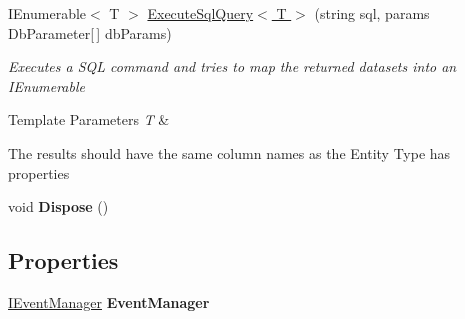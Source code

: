 \begin{DoxyCompactItemize}
I\-Enumerable$<$ T $>$ \hyperlink{class_framework_extension_1_1_entity_framework_1_1_tests_1_1_unit_tests_1_1_e_f_failure_context_ad70050780ddca2e8a5e749a3e0d26a32}{Execute\-Sql\-Query$<$ T $>$} (string sql, params Db\-Parameter\mbox{[}$\,$\mbox{]} db\-Params)
\begin{DoxyCompactList}\small\item\em Executes a S\-Q\-L command and tries to map the returned datasets into an I\-Enumerable
\begin{DoxyTemplParams}{Template Parameters}
{\em T} & \\
\hline
\end{DoxyTemplParams}
The results should have the same column names as the Entity Type has properties \end{DoxyCompactList}\item 
\hypertarget{class_framework_extension_1_1_entity_framework_1_1_tests_1_1_unit_tests_1_1_e_f_failure_context_aed3e8575020a1d9a7d9717f6809049de}{void {\bfseries Dispose} ()}\label{class_framework_extension_1_1_entity_framework_1_1_tests_1_1_unit_tests_1_1_e_f_failure_context_aed3e8575020a1d9a7d9717f6809049de}

\end{DoxyCompactItemize}
\subsection*{Properties}
\begin{DoxyCompactItemize}
\item 
\hypertarget{class_framework_extension_1_1_entity_framework_1_1_tests_1_1_unit_tests_1_1_e_f_failure_context_a898f25dd9c01586a0f0bdca7a6b4abed}{\hyperlink{interface_framework_extension_1_1_core_1_1_interfaces_1_1_i_event_manager}{I\-Event\-Manager} {\bfseries Event\-Manager}}\label{class_framework_extension_1_1_entity_framework_1_1_tests_1_1_unit_tests_1_1_e_f_failure_context_a898f25dd9c01586a0f0bdca7a6b4abed}

\end{DoxyCompactItemize}


